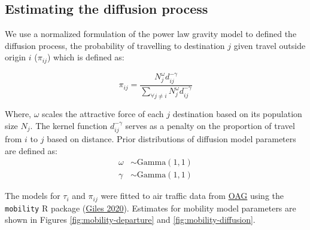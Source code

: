 \documentclass[
]{book}
\begin{document}
\subsection{Estimating the diffusion process}\label{estimating-the-diffusion-process}

We use a normalized formulation of the power law gravity model to defined the diffusion process, the probability of travelling to destination \(j\) given travel outside origin \(i\) (\(\pi_{ij}\)) which is defined as:

\begin{equation}
\pi_{ij} = \frac{
N_j^\omega d_{ij}^{-\gamma}
}{
\sum\limits_{\forall j \ne i} N_j^\omega d_{ij}^{-\gamma}
}
\label{eq:gravity}
\end{equation}

Where, \(\omega\) scales the attractive force of each \(j\) destination based on its population size \(N_j\). The kernel function \(d_{ij}^{-\gamma}\) serves as a penalty on the proportion of travel from \(i\) to \(j\) based on distance. Prior distributions of diffusion model parameters are defined as:
\[
\begin{aligned}
\omega &\sim \text{Gamma}(1, 1)\\
\gamma &\sim \text{Gamma}(1, 1)
\end{aligned} 
\]

The models for \(\tau_i\) and \(\pi_{ij}\) were fitted to air traffic data from \href{https://www.oag.com/flight-data-sets}{OAG} using the \texttt{mobility} R package (\href{https://covid-19-mobility-data-network.github.io/mobility/}{Giles 2020}). Estimates for mobility model parameters are shown in Figures \ref{fig:mobility-departure} and \ref{fig:mobility-diffusion}.
\end{document}
